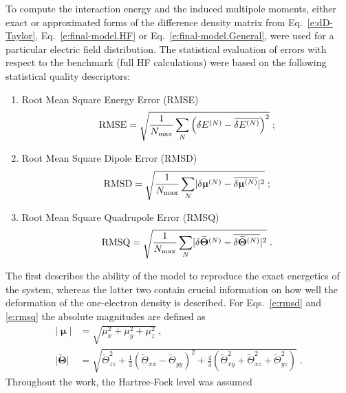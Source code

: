 \documentclass[aip,amsmath,amssymb,reprint,floatfix]{revtex4-1}
\newcommand{\BM}[1]{\bm{#1}}
\begin{document}
To compute the interaction energy and the induced multipole moments, either exact or approximated forms
of the difference density matrix from Eq.~\eqref{e:dD-Taylor}, Eq.~\eqref{e:final-model.HF} or Eq.~\eqref{e:final-model.General},
were used for a particular electric field distribution. The statistical evaluation of
errors with respect to the benchmark (full HF calculations) were based on 
the following statistical quality descriptors:
%
\begin{enumerate}
 \item Root Mean Square Energy Error (RMSE)
   \begin{equation}\label{e:rmse}
     {\rm RMSE} = \sqrt{ \frac{1}{N_{\rm max}} \sum_N \left( \delta E^{(N)} - \overline{\delta E^{(N)}}\right)^2 } \;;
   \end{equation}
 \item Root Mean Square Dipole Error (RMSD)
   \begin{equation}\label{e:rmsd}
     {\rm RMSD} = \sqrt{ \frac{1}{N_{\rm max}}\sum_N \lvert \delta {\BM\upmu}^{(N)} - \overline{\delta {\BM\upmu}^{(N)}}\rvert^2 } \;;
   \end{equation}
 \item Root Mean Square Quadrupole Error (RMSQ)
   \begin{equation}\label{e:rmsq}
     {\rm RMSQ} = \sqrt{ \frac{1}{N_{\rm max}}\sum_N \lvert \delta \widetilde{\BM\Theta}^{(N)} - \overline{\delta \widetilde{\BM\Theta}^{(N)}}\rvert^2 } \;.
   \end{equation}
\end{enumerate}
%
The first describes the ability of the model to reproduce the exact energetics of the system, 
whereas the latter two contain crucial information on how well the deformation of the one\hyp{}electron
density is described. For Eqs.~\eqref{e:rmsd} and \eqref{e:rmsq} the absolute magnitudes
are defined as
%
\begin{subequations}\label{e:absmagn}
  \begin{align}
   \lvert {\BM\upmu} \rvert &= \sqrt{\mu_x^2+\mu_y^2+\mu_z^2} \;,\\
   \lvert {\widetilde{\BM\Theta}}\rvert &= 
          \sqrt{\widetilde{\Theta}_{zz}^2 + \frac{1}{3}\left(\widetilde{\Theta}_{xx}-\widetilde{\Theta}_{yy}\right)^2 
          + \frac{4}{3}\left( \widetilde{\Theta}_{xy}^2 + \widetilde{\Theta}_{xz}^2 + \widetilde{\Theta}_{yz}^2 \right)} \;. 
  \end{align}
\end{subequations}
%
Throughout the work, the Hartree\hyp{}Fock level\cite{Roothaan.RevModPhys.1951} was assumed 
\end{document}
